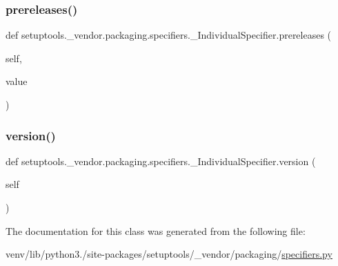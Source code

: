 \subsubsection{\texorpdfstring{prereleases()}{prereleases()}\hspace{0.1cm}{\footnotesize\ttfamily [2/2]}}
{\footnotesize\ttfamily def setuptools.\+\_\+vendor.\+packaging.\+specifiers.\+\_\+\+Individual\+Specifier.\+prereleases (\begin{DoxyParamCaption}\item[{}]{self,  }\item[{}]{value }\end{DoxyParamCaption})}

\mbox{\label{classsetuptools_1_1__vendor_1_1packaging_1_1specifiers_1_1__IndividualSpecifier_adbeb1ca50221bae20afba44631b69ea1}} 
\subsubsection{\texorpdfstring{version()}{version()}}
{\footnotesize\ttfamily def setuptools.\+\_\+vendor.\+packaging.\+specifiers.\+\_\+\+Individual\+Specifier.\+version (\begin{DoxyParamCaption}\item[{}]{self }\end{DoxyParamCaption})}



The documentation for this class was generated from the following file\+:\begin{DoxyCompactItemize}
\item 
venv/lib/python3./site-\/packages/setuptools/\+\_\+vendor/packaging/\hyperlink{setuptools_2__vendor_2packaging_2specifiers_8py}{specifiers.\+py}\end{DoxyCompactItemize}
